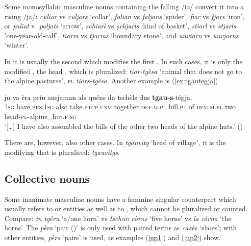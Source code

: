 Some monosyllabic masculine nouns containing the falling  /iə/ convert it into a rising  /ja/: \textit{culiar} vs \textit{culjars} `collar', \textit{falian} vs \textit{faljans} `spider', \textit{fiar} vs \textit{fjars} `iron', or \textit{paliat} v. \textit{paljats} `arrow', \textit{ṣchiarl} vs \textit{ṣchjarls} `kind of basket', \textit{stiarl} vs \textit{stjarls} 'one-year-old-calf', \textit{tiarm} vs \textit{tjarms} `boundary stone', and \textit{unviarn} vs \textit{unvjarns} `winter'.

In  it is usually the second  which modifies the first . In such cases, it is only the modified , the head , which is pluralized: \textit{tiar-tgèsa} `animal that does not go to the alpine pastures', \textsc{pl} \textit{tiars-tgèsa}. Another example is (\ref{ex:tgautegja}).


\ea\label{ex:tgautegja}
\gll  […] ju va\footnotemark{} èra príu ansjaman als quéns da tschèls dus \textbf{tgau}\textbf{-s}-tégja.  \\
    {} \textsc{1sg} have.\textsc{prs.1sg} also take.\textsc{ptcp.unm} together \textsc{def.m.pl} bill.\textsc{pl} of \textsc{dem.m.pl} two head-\textsc{pl}-alpine\_hut.\textsc{f.sg} \\
\glt `[…] I have also assembled the bills of the other two heads of the alpine huts.' (\citealt[87]{Gadola1935})
\z

There are, however, also other cases. In \textit{tgauvitg} `head of village', it is the modifying  that is pluralised: \textit{tgauvitgs}.


\subsection{Collective nouns}\label{sec:3.1.3}
Some inanimate masculine nouns have a feminine singular counterpart which usually refers to  or  entities as well as to , which cannot be pluralized or counted. Compare: \textit{ in tgérn} `a/one horn’ vs \textit{tschun còrns} `five horns’ vs \textit{la còrna} `the horns’. The  \textit{pèra} `pair ()' is only used with paired terms as \textit{cazès} `shoes'; with other entities, \textit{pèrs} `pairs' is used, as examples (\ref{np1}) and (\ref{np2}) show. 

